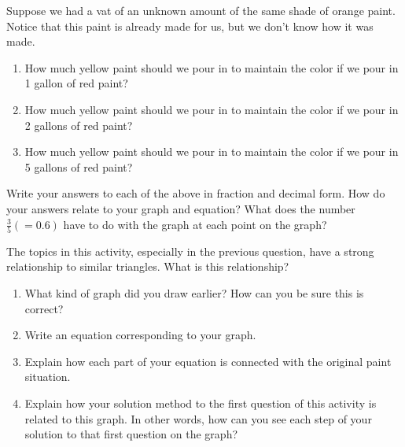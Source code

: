 \documentclass{ximera}
\begin{document}
 

\begin{problem} \label{Orange4}
Suppose we had a vat of an unknown amount of the same shade of orange paint.  Notice that this paint is already made for us, but we don't know how it was made.
\begin{enumerate}
    \item How much yellow paint should we pour in to maintain the color if we pour in 1 gallon of red paint?
    \item How much yellow paint should we pour in to maintain the color if we pour in 2 gallons of red paint?
    \item How much yellow paint should we pour in to maintain the color if we pour in 5 gallons of red paint?
\end{enumerate}
Write your answers to each of the above in fraction and decimal form.  How do your answers relate to your graph and equation?  What does the number $\frac35  (= 0.6)$ have to do with the graph at each point on the graph?
\end{problem}


\begin{problem} \label{Orange5}
The topics in this activity, especially in the previous question, have a strong relationship to similar triangles.  What is this relationship?
\end{problem}



\begin{problem} \label{Orange6}
\begin{enumerate}
    \item What kind of graph did you draw earlier?  How can you be sure this is correct?
    \item Write an equation corresponding to your graph.
    \item Explain how each part of your equation is connected with the original paint situation.
    \item Explain how your solution method to the first question of this activity is related to this graph.  In other words, how can you see each step of your solution to that first question on the graph?
\end{enumerate}
\end{problem}
\end{document}
